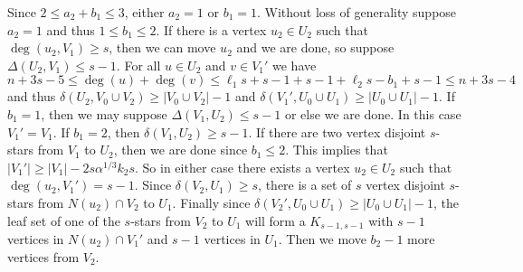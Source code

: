 \documentclass[oneside,12pt]{memoir}
\begin{document}
Since $2\leq a_2+b_1\leq 3$, either $a_2=1$ or $b_1=1$.  Without loss of generality suppose $a_2=1$ and thus $1\leq b_1\leq 2$.  If there is a vertex $u_2\in U_2$ such that $\deg(u_2, V_1)\geq s$, then we can move $u_2$ and we are done, so suppose $\Delta(U_2, V_1)\leq s-1$.  For all $u\in U_2$ and $v\in V_1'$ we have $n+3s-5\leq \deg(u)+\deg(v)\leq \ell_1s+s-1+s-1+\ell_2s-b_1+s-1\leq n+3s-4$ and thus $\delta(U_2, V_0\cup V_2)\geq |V_0\cup V_2|-1$ and $\delta(V_1', U_0\cup U_1)\geq |U_0\cup U_1|-1$.  If $b_1=1$, then we may suppose $\Delta(V_1, U_2)\leq s-1$ or else we are done.  In this case $V_1'=V_1$.  If $b_1=2$, then $\delta(V_1, U_2)\geq s-1$. If there are two vertex disjoint $s$-stars from $V_1$ to $U_2$, then we are done since $b_1\leq 2$.  This implies that $|V_1'|\geq |V_1|-2s\alpha^{1/3}k_2s$.  So in either case there exists a vertex $u_2\in U_2$ such that $\deg(u_2, V_1')=s-1$.  Since $\delta(V_2, U_1)\geq s$, there is a set of $s$ vertex disjoint $s$-stars from $N(u_2)\cap V_2$ to $U_1$.  Finally since $\delta(V_2', U_0\cup U_1)\geq |U_0\cup U_1|-1$, the leaf set of one of the $s$-stars from $V_2$ to $U_1$ will form a $K_{s-1,s-1}$ with $s-1$ vertices in $N(u_2)\cap V_1'$ and $s-1$ vertices in $U_1$.  Then we move $b_2-1$ more vertices from $V_2$.
\end{document}
